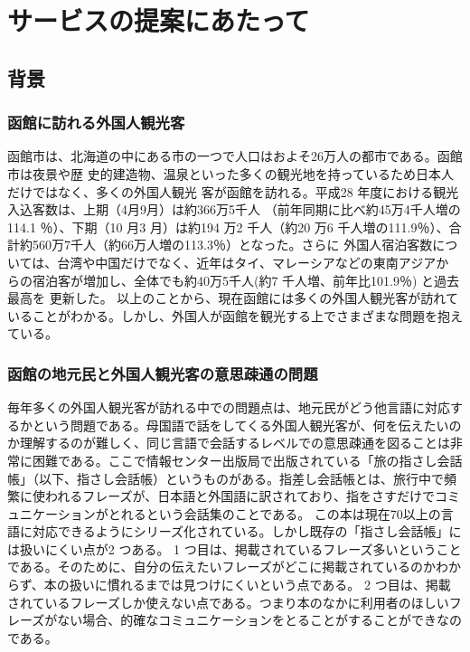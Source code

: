 \documentclass[11pt,papersize]{jsbook}
\begin{document}
\tableofcontents%


\mainmatter%




\chapter{サービスの提案にあたって}

\section{背景}

\subsection{函館に訪れる外国人観光客}
 函館市は、北海道の中にある市の一つで人口はおよそ26万人の都市である。函館市は夜景や歴
史的建造物、温泉といった多くの観光地を持っているため日本人だけではなく、多くの外国人観光
客が函館を訪れる。平成28 年度における観光入込客数は、上期（4月9月）は約366万5千人
（前年同期に比べ約45万4千人増の114.1 ％）、下期（10 月3 月）は約194 万2 千人（約20 万6
千人増の111.9％）、合計約560万7千人（約66万人増の113.3％）となった。さらに
外国人宿泊客数については、台湾や中国だけでなく、近年はタイ、マレーシアなどの東南アジアか
らの宿泊客が増加し、全体でも約40万5千人(約7 千人増、前年比101.9％) と過去最高を
更新した。\cite{b}
以上のことから、現在函館には多くの外国人観光客が訪れていることがわかる。しかし、外国人が函館を観光する上でさまざまな問題を抱えている。

\subsection{函館の地元民と外国人観光客の意思疎通の問題}\label{sec:mokuteki}
 毎年多くの外国人観光客が訪れる中での問題点は、地元民がどう他言語に対応するかという問題である。母国語で話をしてくる外国人観光客が、何を伝えたいのか理解するのが難しく、同じ言語で会話するレベルでの意思疎通を図ることは非常に困難である。ここで情報センター出版局で出版されている「旅の指さし会話帳」（以下、指さし会話帳）というものがある。指差し会話帳とは、旅行中で頻繁に使われるフレーズが、日本語と外国語に訳されており、指をさすだけでコミュニケーションがとれるという会話集のことである。
この本は現在70以上の言語に対応できるようにシリーズ化されている。しかし既存の「指さし会話帳」には扱いにくい点が2 つある。
1 つ目は、掲載されているフレーズ多いということである。そのために、自分の伝えたいフレーズがどこに掲載されているのかわからず、本の扱いに慣れるまでは見つけにくいという点である。
2 つ目は、掲載されているフレーズしか使えない点である。つまり本のなかに利用者のほしいフレーズがない場合、的確なコミュニケーションをとることがすることができなのである。
\end{document}
